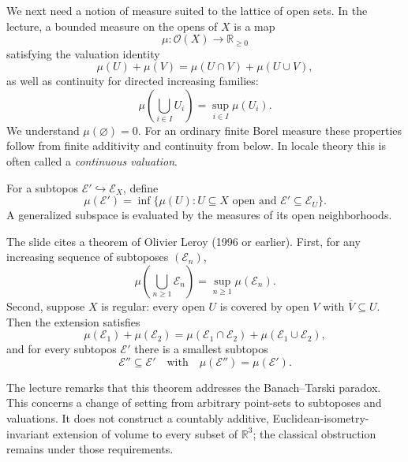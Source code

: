 We next need a notion of measure suited to the lattice of open sets. In the lecture, a bounded measure on the opens of \(X\) is a map
\[
 \mu:\mathcal O(X)\longrightarrow\mathbb R_{\geq0}
\]
satisfying the valuation identity
\begin{equation}
 \mu(U)+\mu(V)=\mu(U\cap V)+\mu(U\cup V),
 \label{eq:N20261026-valuation}
\end{equation}
as well as continuity for directed increasing families:
\begin{equation}
 \mu\left(\bigcup_{i\in I}U_i\right)
 =\sup_{i\in I}\mu(U_i).
 \label{eq:N20261026-directed}
\end{equation}
We understand \(\mu(\varnothing)=0\). For an ordinary finite Borel measure these properties follow from finite additivity and continuity from below. In locale theory this is often called a \emph{continuous valuation}.

For a subtopos \(\mathcal E'\hookrightarrow\mathcal E_X\), define
\begin{equation}
 \mu(\mathcal E')
 =\inf\bigl\{\mu(U):
 U\subseteq X\text{ open and }\mathcal E'\subseteq\mathcal E_U\bigr\}.
 \label{eq:N20261026-subtopos-measure}
\end{equation}
A generalized subspace is evaluated by the measures of its open neighborhoods.

The slide cites a theorem of Olivier Leroy (1996 or earlier). First, for any increasing sequence of subtoposes \((\mathcal E_n)\),
\begin{equation}
 \mu\left(\bigcup_{n\geq1}\mathcal E_n\right)
 =\sup_{n\geq1}\mu(\mathcal E_n).
 \label{eq:N20261026-leroy-increasing}
\end{equation}
Second, suppose \(X\) is regular: every open \(U\) is covered by open \(V\) with \(\overline V\subseteq U\). Then the extension satisfies
\begin{equation}
 \mu(\mathcal E_1)+\mu(\mathcal E_2)
 =\mu(\mathcal E_1\cap\mathcal E_2)
  +\mu(\mathcal E_1\cup\mathcal E_2),
 \label{eq:N20261026-leroy-modular}
\end{equation}
and for every subtopos \(\mathcal E'\) there is a smallest subtopos
\[
 \mathcal E''\subseteq\mathcal E'
 \quad\text{with}\quad
 \mu(\mathcal E'')=\mu(\mathcal E').
\]

The lecture remarks that this theorem addresses the Banach--Tarski paradox. This concerns a change of setting from arbitrary point-sets to subtoposes and valuations. It does not construct a countably additive, Euclidean-isometry-invariant extension of volume to every subset of \(\mathbb R^3\); the classical obstruction remains under those requirements.

